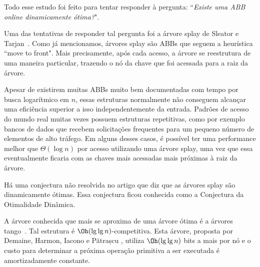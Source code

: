 Todo esse estudo foi feito para tentar responder à pergunta: ``\textit{Existe uma ABB online dinamicamente ótima?}".

Uma das tentativas de responder tal pergunta foi a árvore splay de Sleator e Tarjan~\cite{selfadjustingbst}. Como já mencionamos, árvores splay são ABBs que seguem a heurística ``move to front". Mais precisamente, após cada acesso, a árvore se reestrutura de uma maneira particular, trazendo o nó da chave que foi acessada para a raiz da árvore.

Apesar de existirem muitas ABBs muito bem documentadas com tempo por busca logarítmico em $n$, essas estruturas normalmente não conseguem alcançar uma eficiência superior a isso independentemente da entrada. Padrões de acesso do mundo real muitas vezes possuem estruturas repetitivas, como por exemplo bancos de dados que recebem solicitações frequentes para um pequeno número de elementos de alto tráfego. Em alguns desses casos, é possível ter uma performance melhor que $\Theta(\log n)$ por acesso utilizando uma árvore splay, uma vez que essa eventualmente ficaria com as chaves mais acessadas mais próximas à raiz da árvore. 

Há uma conjectura não resolvida no artigo \cite{selfadjustingbst} que diz que as árvores splay são dinamicamente ótimas. Essa conjectura ficou conhecida como a Conjectura da Otimalidade Dinâmica.

A árvore conhecida que mais se aproxima de uma árvore ótima é a árvores tango~\cite{dynamicoptimality}. Tal estrutura é $\Oh(\lg \lg n)$-competitiva. Esta árvore, proposta por Demaine, Harmon, Iacono e Pătrașcu \cite{dynamicoptimality}, utiliza $\Oh(\lg \lg n)$ bits a mais por nó e o custo para determinar a próxima operação primitiva a ser executada é amortizadamente constante.




